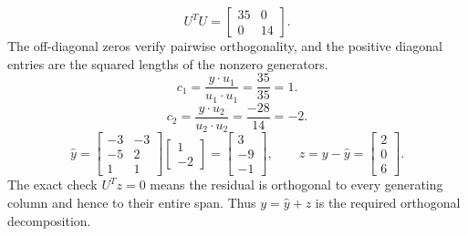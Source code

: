 \[U^TU=\left[\begin{array}{rr}35&0\\0&14\end{array}\right].\]
The off-diagonal zeros verify pairwise orthogonality, and the positive diagonal entries are the squared lengths of the nonzero generators.
\[c_{1}=\frac{y\cdot u_{1}}{u_{1}\cdot u_{1}}=\frac{35}{35}=1.\]
\[c_{2}=\frac{y\cdot u_{2}}{u_{2}\cdot u_{2}}=\frac{-28}{14}=-2.\]
\[\widehat y=\left[\begin{array}{rr}-3&-3\\-5&2\\1&1\end{array}\right]\left[\begin{array}{r}1\\-2\end{array}\right]=\left[\begin{array}{r}3\\-9\\-1\end{array}\right],\qquad z=y-\widehat y=\left[\begin{array}{r}2\\0\\6\end{array}\right].\]
The exact check $U^Tz=0$ means the residual is orthogonal to every generating column and hence to their entire span. Thus $y=\widehat y+z$ is the required orthogonal decomposition.

